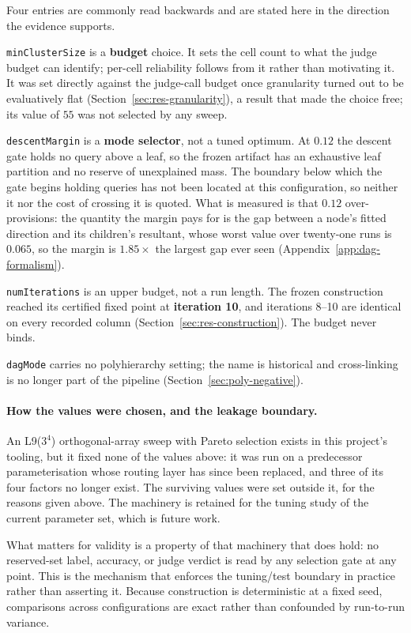 Four entries are commonly read backwards and are stated here in the direction
the evidence supports.

\texttt{minClusterSize} is a \textbf{budget} choice. It sets the cell count to
what the judge budget can identify; per-cell reliability follows from it rather
than motivating it. It was set directly against the judge-call budget once
granularity turned out to be evaluatively flat
(Section~\ref{sec:res-granularity}), a result that made the choice free; its
value of $55$ was not selected by any sweep.

\texttt{descentMargin} is a \textbf{mode selector}, not a tuned optimum. At
$0.12$ the descent gate holds no query above a leaf, so the frozen artifact has
an exhaustive leaf partition and no reserve of unexplained mass. The boundary
below which the gate begins holding queries has not been located at this
configuration, so neither it nor the cost of crossing it is quoted. What is
measured is that $0.12$ over-provisions: the quantity the margin pays for is
the gap between a node's fitted direction and its children's resultant, whose
worst value over twenty-one runs is $0.065$, so the margin is $1.85\times$ the
largest gap ever seen (Appendix~\ref{app:dag-formalism}).

\texttt{numIterations} is an upper budget, not a run length. The frozen
construction reached its certified fixed point at \textbf{iteration 10}, and
iterations 8--10 are identical on every recorded column
(Section~\ref{sec:res-construction}). The budget never binds.

\texttt{dagMode} carries no polyhierarchy setting; the name is historical and
cross-linking is no longer part of the pipeline
(Section~\ref{sec:poly-negative}).

\paragraph{How the values were chosen, and the leakage boundary.} An
L9($3^4$) orthogonal-array sweep with Pareto selection exists in this project's
tooling, but it fixed none of the values above: it was run on a predecessor
parameterisation whose routing layer has since been replaced, and three of its
four factors no longer exist. The surviving values were set outside it, for the
reasons given above. The machinery is retained for the tuning study of the
current parameter set, which is future work.

What matters for validity is a property of that machinery that does hold: no
reserved-set label, accuracy, or judge verdict is read by any selection gate at
any point. This is the mechanism that enforces the tuning/test boundary in
practice rather than asserting it. Because construction is deterministic at a
fixed seed, comparisons across configurations are exact rather than confounded
by run-to-run variance.

